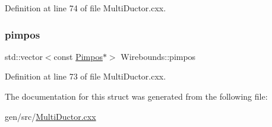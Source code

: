 Definition at line 74 of file Multi\+Ductor.\+cxx.

\mbox{\label{struct_wirebounds_a0088eec86ae6cddaba6e8b0176c161f5}} 
\subsubsection{\texorpdfstring{pimpos}{pimpos}}
{\footnotesize\ttfamily std\+::vector$<$const \hyperlink{class_wire_cell_1_1_pimpos}{Pimpos}$\ast$$>$ Wirebounds\+::pimpos}



Definition at line 73 of file Multi\+Ductor.\+cxx.



The documentation for this struct was generated from the following file\+:\begin{DoxyCompactItemize}
\item 
gen/src/\hyperlink{_multi_ductor_8cxx}{Multi\+Ductor.\+cxx}\end{DoxyCompactItemize}
